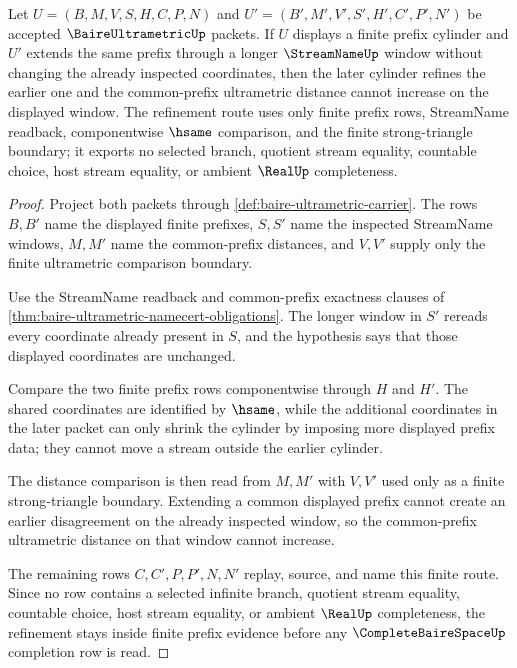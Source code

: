 \begin{theorem}\label{thm:baire-ultrametric-cylinder-refinement}
Let $U=(B,M,V,S,H,C,P,N)$ and $U'=(B',M',V',S',H',C',P',N')$ be accepted $\BaireUltrametricUp$ packets. If $U$ displays a finite prefix cylinder and $U'$ extends the same prefix through a longer $\StreamNameUp$ window without changing the already inspected coordinates, then the later cylinder refines the earlier one and the common-prefix ultrametric distance cannot increase on the displayed window. The refinement route uses only finite prefix rows, StreamName readback, componentwise $\hsame$ comparison, and the finite strong-triangle boundary; it exports no selected branch, quotient stream equality, countable choice, host stream equality, or ambient $\RealUp$ completeness.
\end{theorem}
\begin{proof}
Project both packets through \autoref{def:baire-ultrametric-carrier}. The rows $B,B'$ name the displayed finite prefixes, $S,S'$ name the inspected StreamName windows, $M,M'$ name the common-prefix distances, and $V,V'$ supply only the finite ultrametric comparison boundary.

Use the StreamName readback and common-prefix exactness clauses of \autoref{thm:baire-ultrametric-namecert-obligations}. The longer window in $S'$ rereads every coordinate already present in $S$, and the hypothesis says that those displayed coordinates are unchanged.

Compare the two finite prefix rows componentwise through $H$ and $H'$. The shared coordinates are identified by $\hsame$, while the additional coordinates in the later packet can only shrink the cylinder by imposing more displayed prefix data; they cannot move a stream outside the earlier cylinder.

The distance comparison is then read from $M,M'$ with $V,V'$ used only as a finite strong-triangle boundary. Extending a common displayed prefix cannot create an earlier disagreement on the already inspected window, so the common-prefix ultrametric distance on that window cannot increase.

The remaining rows $C,C',P,P',N,N'$ replay, source, and name this finite route. Since no row contains a selected infinite branch, quotient stream equality, countable choice, host stream equality, or ambient $\RealUp$ completeness, the refinement stays inside finite prefix evidence before any $\CompleteBaireSpaceUp$ completion row is read.
\end{proof}

